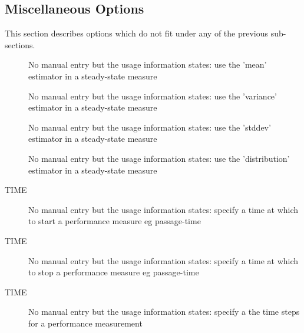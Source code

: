 \subsection{Miscellaneous Options}
This section describes options which do not fit
under any of the previous sub-sections.

\begin{description}
\item[ ]
No manual entry but the usage information states:
use the 'mean' estimator in a steady-state measure
\end{description}

\begin{description}
\item[ ]
No manual entry but the usage information states:
use the 'variance' estimator in a steady-state measure
\end{description}

\begin{description}
\item[ ]
No manual entry but the usage information states:
use the 'stddev' estimator in a steady-state measure
\end{description}

\begin{description}
\item[ ]
No manual entry but the usage information states:
use the 'distribution' estimator in a steady-state measure
\end{description}

\begin{description}
\item[ TIME]
No manual entry but the usage information states:
specify a time at which to start a performance measure eg passage-time
\end{description}

\begin{description}
\item[ TIME]
No manual entry but the usage information states:
specify a time at which to stop a performance measure eg passage-time
\end{description}

\begin{description}
\item[ TIME]
No manual entry but the usage information states:
specify a the time steps for a performance measurement
\end{description}

